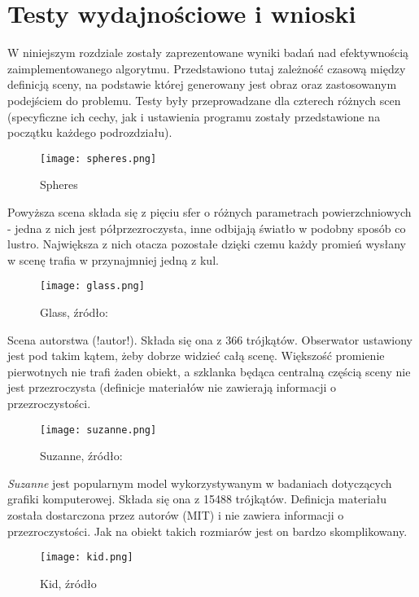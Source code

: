 \section{Testy wydajnościowe i wnioski}

W niniejszym rozdziale zostały zaprezentowane wyniki badań nad efektywnością zaimplementowanego algorytmu. Przedstawiono tutaj zależność czasową między definicją sceny, na podstawie której generowany jest obraz oraz zastosowanym podejściem do problemu. Testy były przeprowadzane dla czterech różnych scen (specyficzne ich cechy, jak i ustawienia programu zostały przedstawione na początku każdego podrozdziału).

\begin{figure}[htb!]
\centering
  \caption{Spheres}
  \texttt{[image: spheres.png]}
\end{figure}

Powyższa scena składa się z pięciu sfer o różnych parametrach powierzchniowych - jedna z nich jest półprzezroczysta, inne odbijają światło w podobny sposób co lustro. Największa z nich otacza pozostałe dzięki czemu każdy promień wysłany w scenę trafia w przynajmniej jedną z kul.

\begin{figure}[htb!]
\centering
  \caption{Glass, źródło: }
  \texttt{[image: glass.png]}
\end{figure}

Scena autorstwa (!autor!). Składa się ona z 366 trójkątów. Obserwator ustawiony jest pod takim kątem, żeby dobrze widzieć całą scenę. Większość promienie pierwotnych nie trafi żaden obiekt, a szklanka będąca centralną częścią sceny nie jest przezroczysta (definicje materiałów nie zawierają informacji o przezroczystości.
\pagebreak

\begin{figure}[htb!]
\centering
  \caption{Suzanne, źródło: }
  \texttt{[image: suzanne.png]}
\end{figure}


\emph{Suzanne} jest popularnym model wykorzystywanym w badaniach dotyczących grafiki komputerowej. Składa się ona z 15488 trójkątów. Definicja materiału została dostarczona przez autorów (MIT) i nie zawiera informacji o przezroczystości. Jak na obiekt takich rozmiarów jest on bardzo skomplikowany.

\begin{figure}[htb!]
\centering
  \caption{Kid, źródło}
  \texttt{[image: kid.png]}
\end{figure}

